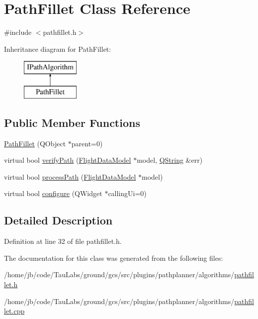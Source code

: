 \hypertarget{class_path_fillet}{\section{\-Path\-Fillet \-Class \-Reference}
\label{class_path_fillet}
}


{\ttfamily \#include $<$pathfillet.\-h$>$}

\-Inheritance diagram for \-Path\-Fillet\-:\begin{figure}[H]
\begin{center}
\leavevmode
\includegraphics[height=2.000000cm]{class_path_fillet}
\end{center}
\end{figure}
\subsection*{\-Public \-Member \-Functions}
\begin{DoxyCompactItemize}
\item 
\hyperlink{group___path_ga239ceff0ba45400e38be3f6641054f4c}{\-Path\-Fillet} (\-Q\-Object $\ast$parent=0)
\item 
virtual bool \hyperlink{group___path_gaf69499501bc26d9321cb3edaabaf8b21}{verify\-Path} (\hyperlink{class_flight_data_model}{\-Flight\-Data\-Model} $\ast$model, \hyperlink{group___u_a_v_objects_plugin_gab9d252f49c333c94a72f97ce3105a32d}{\-Q\-String} \&err)
\item 
virtual bool \hyperlink{group___path_ga1e32689145e646e17836652d3e90067c}{process\-Path} (\hyperlink{class_flight_data_model}{\-Flight\-Data\-Model} $\ast$model)
\item 
virtual bool \hyperlink{group___path_ga4ab477c2642c61f1169c6aa07228ec64}{configure} (\-Q\-Widget $\ast$calling\-Ui=0)
\end{DoxyCompactItemize}


\subsection{\-Detailed \-Description}


\-Definition at line 32 of file pathfillet.\-h.



\-The documentation for this class was generated from the following files\-:\begin{DoxyCompactItemize}
\item 
/home/jb/code/\-Tau\-Labs/ground/gcs/src/plugins/pathplanner/algorithms/\hyperlink{pathfillet_8h}{pathfillet.\-h}\item 
/home/jb/code/\-Tau\-Labs/ground/gcs/src/plugins/pathplanner/algorithms/\hyperlink{pathfillet_8cpp}{pathfillet.\-cpp}\end{DoxyCompactItemize}
